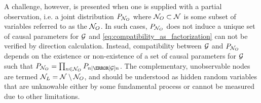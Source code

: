 \documentclass[aps, 10pt, english, twoside, pra, nofootinbib, tightenlines, longbibliography, superscriptaddress]{revtex4-1}
\begin{document}
    A challenge, however, is presented when one is supplied with a partial observation, i.e. a joint distribution $\prob[\nodes_{O}]$ where $\mathcal{N}_{O} \subset \mathcal{N}$ is some subset of variables referred to as the  $\mathcal{N}_O$. In such cases, $\prob[\nodes_{O}]$ does not induce a unique set of causal parameters for $\mathcal{G}$ and \cref{eq:compatibility_as_factorization} can not be verified by direction calculation. Instead, compatibility between $\mathcal{G}$ and $\prob[\nodes_{O}]$ depends on the existence or non-existence of a set of causal parameters for $\mathcal{G}$ such that $\prob[\nodes_{O}] = \prod_{n \in \nodes_{O}} \prob[n \mid \Pa[\graph]{n}]$. The complementary, unobservable nodes are termed  $\mathcal{N}_L = \mathcal{N} \setminus \mathcal{N}_{O}$, and should be understood as hidden random variables that are unknowable either by some fundamental process or cannot be measured due to other limitations.
\end{document}
